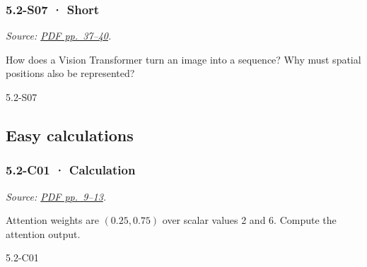 \noindent\begin{minipage}{\linewidth}

\subsubsection{5.2-S07 · Short}\label{s07-short-13}

\emph{Source:
\href{../Lecture\%20Slides/5.2.\%20Transformers.pdf\#page=37}{PDF
pp.~37--40}.}

How does a Vision Transformer turn an image into a sequence? Why must
spatial positions also be represented?

\begin{solution}[20mm]{5.2-S07}

\end{solution}
\end{minipage}\par\medskip

\subsection{Easy calculations}\label{easy-calculations-14}

\noindent\begin{minipage}{\linewidth}

\subsubsection{5.2-C01 · Calculation}\label{c01-calculation-13}

\emph{Source:
\href{../Lecture\%20Slides/5.2.\%20Transformers.pdf\#page=9}{PDF
pp.~9--13}.}

Attention weights are \((0.25,0.75)\) over scalar values 2 and 6.
Compute the attention output.

\begin{solution}[26mm]{5.2-C01}

\end{solution}
\end{minipage}\par\medskip

